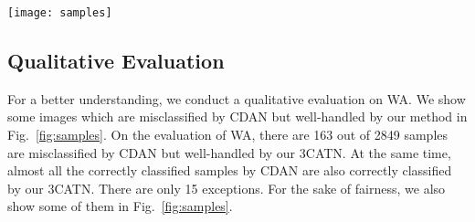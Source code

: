 \documentclass[sigconf]{acmart}
\begin{document}
\begin{figure*}[t!h]
\begin{center}
\end{center}
\vspace{-16pt}
\caption{Parameter sensitivity (a-c) and training stability (d). The parameters in our model are tuned by importance weighted cross validation~\cite{sugiyama2007covariate}. WA and AW on Office-31 dataset are evaluated as examples. }
\label{fig:para}
\vspace{-5pt}
\end{figure*}

\begin{figure*}[t!h]
\begin{center}
\texttt{[image: samples]}
\end{center}
\vspace{-10pt}
\caption{Qualitative results on WA. Blue label is the ground-truth and gray label is the prediction. This figure mainly shows some randomly selected samples which are wrongly predicted by CDAN but correctly classified by our 3CATN. Although almost all of the samples which are correctly predicted by CDAN are also correctly handled by our method, we show several exceptions within the dash lines for the sake of fairness.}
\label{fig:samples}
\vspace{-5pt}
\end{figure*}


\subsection{Qualitative Evaluation}
For a better understanding, we conduct a qualitative evaluation on WA. We show some images which are misclassified by CDAN but well-handled by our method in Fig.~\ref{fig:samples}. On the evaluation of WA, there are 163 out of 2849 samples are misclassified by CDAN but well-handled by our 3CATN. At the same time, almost all the correctly classified samples by CDAN are also correctly classified by our 3CATN. There are only 15 exceptions. For the sake of fairness, we also show some of them in Fig.~\ref{fig:samples}.
\end{document}
